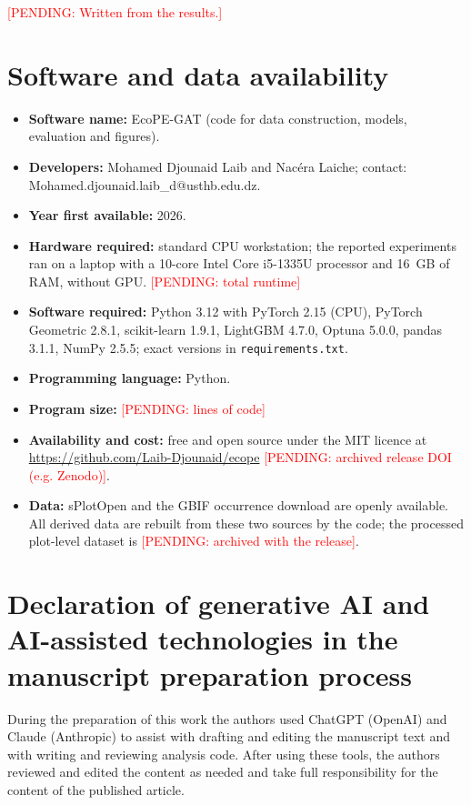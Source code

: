 \documentclass[a4paper,fleqn]{cas-sc}
\newcommand{\pending}[1]{\textcolor{red}{[PENDING: #1]}}
\begin{document}
\pending{Written from the results.}

\section*{Software and data availability}
\begin{itemize}[leftmargin=1.4em]
  \item \textbf{Software name:} EcoPE-GAT (code for data construction, models, evaluation and figures).
  \item \textbf{Developers:} Mohamed Djounaid Laib and Nacéra Laiche; contact: Mohamed.djounaid.laib\_d@usthb.edu.dz.
  \item \textbf{Year first available:} 2026.
  \item \textbf{Hardware required:} standard CPU workstation; the reported experiments ran on a laptop with a 10-core Intel Core i5-1335U processor and 16~GB of RAM, without GPU. \pending{total runtime}
  \item \textbf{Software required:} Python 3.12 with PyTorch 2.15 (CPU), PyTorch Geometric 2.8.1, scikit-learn 1.9.1, LightGBM 4.7.0, Optuna 5.0.0, pandas 3.1.1, NumPy 2.5.5; exact versions in \texttt{requirements.txt}.
  \item \textbf{Programming language:} Python.
  \item \textbf{Program size:} \pending{lines of code}
  \item \textbf{Availability and cost:} free and open source under the MIT licence at \url{https://github.com/Laib-Djounaid/ecope} \pending{archived release DOI (e.g. Zenodo)}.
  \item \textbf{Data:} sPlotOpen \citep{splotdata} and the GBIF occurrence download \citep{gbifdownload} are openly available. All derived data are rebuilt from these two sources by the code; the processed plot-level dataset is \pending{archived with the release}.
\end{itemize}

\section*{Declaration of generative AI and AI-assisted technologies in the manuscript preparation process}
During the preparation of this work the authors used ChatGPT (OpenAI) and Claude (Anthropic) to assist with drafting and editing the manuscript text and with writing and reviewing analysis code. After using these tools, the authors reviewed and edited the content as needed and take full responsibility for the content of the published article.
\end{document}
